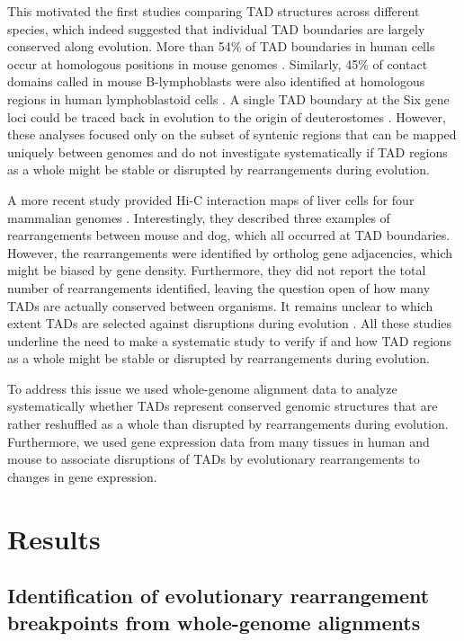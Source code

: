 \documentclass[a4paper,twoside=true,openright,parskip=full,chapterprefix=true,11pt,headings=normal,bibliography=totoc,listof=totoc,titlepage=on,captions=tableabove,draft=false]{scrreprt}
\theoremstyle{definition}
\theoremstyle{definition}
\theoremstyle{definition}
\theoremstyle{remark}
\begin{document}
This motivated the first studies comparing TAD structures across
different species, which indeed suggested that individual TAD boundaries
are largely conserved along evolution. More than 54\% of TAD boundaries
in human cells occur at homologous positions in mouse genomes
\citep{Dixon2012}. Similarly, 45\% of contact domains called in mouse
B-lymphoblasts were also identified at homologous regions in human
lymphoblastoid cells \citep{Rao2014}. A single TAD boundary at the Six
gene loci could be traced back in evolution to the origin of
deuterostomes \citep{Gomez-Marin2015}. However, these analyses focused
only on the subset of syntenic regions that can be mapped uniquely
between genomes and do not investigate systematically if TAD regions as
a whole might be stable or disrupted by rearrangements during evolution.

A more recent study provided Hi-C interaction maps of liver cells for
four mammalian genomes \citep{VietriRudan2015}. Interestingly, they
described three examples of rearrangements between mouse and dog, which
all occurred at TAD boundaries. However, the rearrangements were
identified by ortholog gene adjacencies, which might be biased by gene
density. Furthermore, they did not report the total number of
rearrangements identified, leaving the question open of how many TADs
are actually conserved between organisms. It remains unclear to which
extent TADs are selected against disruptions during evolution
\citep{Nora2013}. All these studies underline the need to make a
systematic study to verify if and how TAD regions as a whole might be
stable or disrupted by rearrangements during evolution.

To address this issue we used whole-genome alignment data to analyze
systematically whether TADs represent conserved genomic structures that
are rather reshuffled as a whole than disrupted by rearrangements during
evolution. Furthermore, we used gene expression data from many tissues
in human and mouse to associate disruptions of TADs by evolutionary
rearrangements to changes in gene expression.

\hypertarget{results-1}{%
\section{Results}\label{results-1}}

\hypertarget{identification-of-evolutionary-rearrangement-breakpoints-from-whole-genome-alignments}{%
\subsection{Identification of evolutionary rearrangement breakpoints
from whole-genome
alignments}\label{identification-of-evolutionary-rearrangement-breakpoints-from-whole-genome-alignments}}
\end{document}
